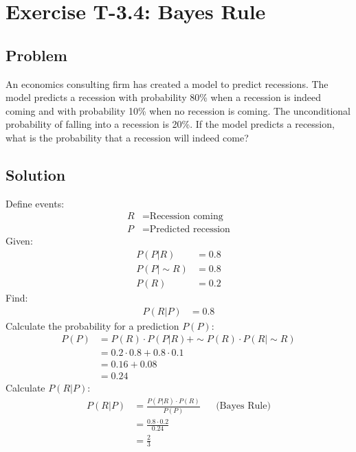 \section*{Exercise T-3.4: Bayes Rule}

\subsection*{Problem}

An economics consulting firm has created a model to predict recessions. The model predicts a recession with probability 80\% when a recession is indeed coming and with probability 10\% when no recession is coming. The unconditional probability of falling into a recession is 20\%. If the model predicts a recession, what is the probability that a recession will indeed come?

\subsection*{Solution}
Define events:
\begin{align}
	R &= \text{Recession coming}\nonumber \\
	P &= \text{Predicted recession}\nonumber
\end{align}
Given:
\begin{align}
	P(P|R) &= 0.8 \nonumber \\
	P(P|\sim R) &= 0.8 \nonumber \\
	P(R) &= 0.2 \nonumber
\end{align}
Find:
\begin{align}
	P(R|P) &= 0.8 \nonumber
\end{align}
Calculate the probability for a prediction $P(P)$:
\begin{align}
	P(P) &= P(R) \cdot P(P|R) + \sim P(R) \cdot P(R|\sim R) \nonumber \\
	&= 0.2 \cdot 0.8 + 0.8 \cdot 0.1 \nonumber \\
	&= 0.16 + 0.08 \nonumber \\
	&= 0.24 \nonumber 
\end{align}
Calculate $P(R|P)$:
\begin{align}
	P(R|P) &= \frac{P(P|R) \cdot  P(R)}{P(P)} && \text{(Bayes Rule)} \nonumber \\
	&= \frac{0.8 \cdot 0.2}{0.24} \nonumber \\
	&= \frac{2}{3} \nonumber
\end{align}
